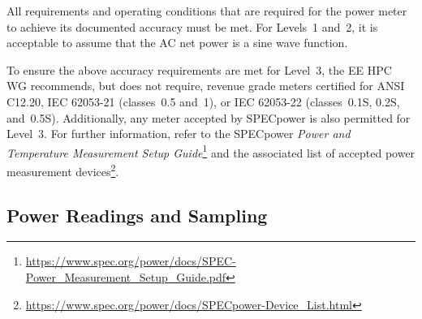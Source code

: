 All requirements and operating conditions that are required for the power meter to achieve its documented accuracy must be met.
For Levels~1 and~2, it is acceptable to assume that the AC net power is a sine wave function.


To ensure the above accuracy requirements are met for Level~3, the \ac{EE HPC WG} recommends, but does not require, revenue grade meters certified for ANSI C12.20, IEC 62053-21 (classes~0.5 and~1), or IEC 62053-22 (classes~0.1S, 0.2S, and~0.5S).
Additionally, any meter accepted by SPECpower is also permitted for Level~3.
For further information, refer to the SPECpower \textit{Power and Temperature Measurement Setup Guide}\footnote{\url{https://www.spec.org/power/docs/SPEC-Power_Measurement_Setup_Guide.pdf}} and the associated list of accepted power measurement devices\footnote{\url{https://www.spec.org/power/docs/SPECpower-Device_List.html}}.

\subsection{Power Readings and Sampling}
\label{subsec:PAaTEM}

